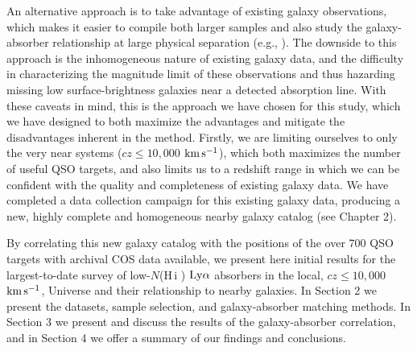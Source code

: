 \documentclass[twocolumn,tighten]{aastex62}
\newcommand{\kms}{$\rm km\, s^{-1}$}
\newcommand{\HI}{\mbox{H\,{\sc i}} }
\begin{document}
An alternative approach is to take advantage of existing galaxy observations, which makes it easier to compile both larger samples and also study the galaxy-absorber relationship at large physical separation (e.g., \citealt{wakker2009, rudie2012a}). The downside to this approach is the inhomogeneous nature of existing galaxy data, and the difficulty in characterizing the magnitude limit of these observations and thus hazarding missing low surface-brightness galaxies near a detected absorption line. With these caveats in mind, this is the approach we have chosen for this study, which we have designed to both maximize the advantages and mitigate the disadvantages inherent in the method. Firstly, we are limiting ourselves to only the very near systems ($cz \leq 10,000$ \kms), which both maximizes the number of useful QSO targets, and also limits us to a redshift range in which we can be confident with the quality and completeness of existing galaxy data. We have completed a data collection campaign for this existing galaxy data, producing a new, highly complete and homogeneous nearby galaxy catalog (see Chapter 2). 

By correlating this new galaxy catalog with the positions of the over 700 QSO targets with archival COS data available, we present here initial results for the largest-to-date survey of low-$N$(\HI) $\rm Ly\alpha$ absorbers in the local, $cz \leq 10,000$\kms, Universe and their relationship to nearby galaxies. In Section 2 we present the datasets, sample selection, and galaxy-absorber matching methods. In Section 3 we present and discuss the results of the galaxy-absorber correlation, and in Section 4 we offer a summary of our findings and conclusions.

\end{document}
